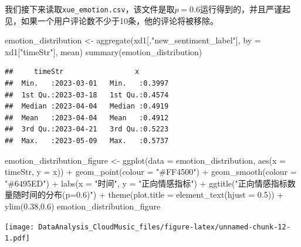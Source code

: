 \documentclass[
]{article}
\newenvironment{Shaded}{\begin{snugshade}}{\end{snugshade}}
\newcommand{\AttributeTok}[1]{\textcolor[rgb]{0.77,0.63,0.00}{#1}}
\newcommand{\FloatTok}[1]{\textcolor[rgb]{0.00,0.00,0.81}{#1}}
\newcommand{\FunctionTok}[1]{\textcolor[rgb]{0.00,0.00,0.00}{#1}}
\newcommand{\NormalTok}[1]{#1}
\newcommand{\OtherTok}[1]{\textcolor[rgb]{0.56,0.35,0.01}{#1}}
\newcommand{\SpecialCharTok}[1]{\textcolor[rgb]{0.00,0.00,0.00}{#1}}
\newcommand{\StringTok}[1]{\textcolor[rgb]{0.31,0.60,0.02}{#1}}
\begin{document}
我们接下来读取\texttt{xue\_emotion.csv}，该文件是取\(p=0.6\)运行得到的，并且严谨起见，如果一个用户评论数不少于10条，他的评论将被移除。

\begin{Shaded}
\begin{Highlighting}[]
\NormalTok{emotion\_distribution }\OtherTok{\textless{}{-}} \FunctionTok{aggregate}\NormalTok{(xd1[,}\StringTok{"new\_sentiment\_label"}\NormalTok{], }\AttributeTok{by =}\NormalTok{ xd1[}\StringTok{"timeStr"}\NormalTok{], mean)}
\FunctionTok{summary}\NormalTok{(emotion\_distribution)}
\end{Highlighting}
\end{Shaded}

\begin{verbatim}
##     timeStr                 x         
##  Min.   :2023-03-01   Min.   :0.3997  
##  1st Qu.:2023-03-18   1st Qu.:0.4574  
##  Median :2023-04-04   Median :0.4919  
##  Mean   :2023-04-04   Mean   :0.4912  
##  3rd Qu.:2023-04-21   3rd Qu.:0.5223  
##  Max.   :2023-05-09   Max.   :0.5737
\end{verbatim}

\begin{Shaded}
\begin{Highlighting}[]
\NormalTok{emotion\_distribution\_figure }\OtherTok{\textless{}{-}} \FunctionTok{ggplot}\NormalTok{(}\AttributeTok{data =}\NormalTok{ emotion\_distribution, }\FunctionTok{aes}\NormalTok{(}\AttributeTok{x =}\NormalTok{ timeStr, }\AttributeTok{y =}\NormalTok{ x)) }\SpecialCharTok{+} \FunctionTok{geom\_point}\NormalTok{(}\AttributeTok{colour =} \StringTok{"\#FF4500"}\NormalTok{) }\SpecialCharTok{+} \FunctionTok{geom\_smooth}\NormalTok{(}\AttributeTok{colour =} \StringTok{"\#6495ED"}\NormalTok{) }\SpecialCharTok{+} \FunctionTok{labs}\NormalTok{(}\AttributeTok{x =} \StringTok{"时间"}\NormalTok{, }\AttributeTok{y =} \StringTok{"正向情感指标"}\NormalTok{) }\SpecialCharTok{+} \FunctionTok{ggtitle}\NormalTok{(}\StringTok{"正向情感指标数量随时间的分布(p=0.6)"}\NormalTok{) }\SpecialCharTok{+} \FunctionTok{theme}\NormalTok{(}\AttributeTok{plot.title =} \FunctionTok{element\_text}\NormalTok{(}\AttributeTok{hjust =} \FloatTok{0.5}\NormalTok{)) }\SpecialCharTok{+} \FunctionTok{ylim}\NormalTok{(}\FloatTok{0.38}\NormalTok{,}\FloatTok{0.6}\NormalTok{)}
\NormalTok{emotion\_distribution\_figure}
\end{Highlighting}
\end{Shaded}

\texttt{[image: DataAnalysis\_CloudMusic\_files/figure-latex/unnamed-chunk-12-1.pdf]}
\end{document}
